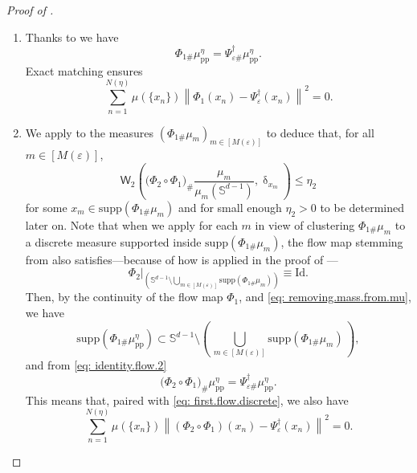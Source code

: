 \documentclass[a4paper,11pt]{article}
\theoremstyle{plain}
\newcommand{\supp}{\mathrm{supp}}
\renewcommand{\S}{\mathbb{S}^{d-1}}
\renewcommand{\leq}{\leqslant}
\numberwithin{equation}{section}
\begin{document}
\begin{proof}[Proof of ]
\begin{enumerate}
    \item Thanks to  we have
\begin{equation*}
\Phi_{1\#}\mu^\eta_{\text{pp}}=\Psi^\dagger_{\varepsilon\#} \mu^\eta_{\text{pp}}.
\end{equation*}
Exact matching ensures
\begin{equation}\label{eq: first.flow.discrete}
    \sum_{n=1}^{N(\eta)} \mu(\{x_n\})\left\|\Phi_1(x_n)-\Psi^\dagger_\varepsilon(x_n)\right\|^2=0.
\end{equation}
\item We apply  to the measures $(\Phi_{1\#}\mu_m)_{m\in[M(\varepsilon)]}$ to deduce that, for all $m\in[M(\varepsilon)]$,
\begin{equation*}
\mathsf{W}_2\left(\Big(\Phi_2\circ\Phi_1\Big)_{\#}\frac{\mu_m}{ \mu_m(\S)}, \updelta_{x_{m}}\right)\leq \eta_2
\end{equation*}
for some $x_{m}\in \supp(\Phi_{1\#}\mu_m)$ and for small enough $\eta_2>0$ to be determined later on. Note that when we apply  for each $m$ in view of clustering $\Phi_{1\#}\mu_m$ to a discrete measure supported inside $\supp(\Phi_{1\#}\mu_m)$, the flow map stemming from  also satisfies---because of how  is applied in the proof of ---
\begin{equation}\label{eq: identity.flow.2}
\Phi_2\bigg|_{\left(\S\setminus\bigcup_{m\in[M(\varepsilon)]} \supp(\Phi_{1\#}\mu_m)\right)}\equiv\mathrm{Id}.
\end{equation}
Then, by the continuity of the flow map $\Phi_1$, and \eqref{eq: removing.mass.from.mu},
we have 
$$
\supp\left(\Phi_{1\#}\mu_{\text{pp}}^\eta\right)\subset \S\setminus\left(\,\bigcup_{m\in[M(\varepsilon)]}\supp(\Phi_{1\#}\mu_m)\,\right),
$$
and from \eqref{eq: identity.flow.2}
\begin{equation*}
    \Big(\Phi_2\circ\Phi_1\Big)_\#\mu^\eta_{\text{pp}} =\Psi^\dagger_{\varepsilon\#}\mu^\eta_{\text{pp}}.
\end{equation*}
This means that, paired with \eqref{eq: first.flow.discrete}, we also have
\begin{equation*} %
    \sum_{n=1}^{N(\eta)} \mu(\{x_n\})\left\|(\Phi_2\circ\Phi_1)(x_n)-\Psi^\dagger_\varepsilon(x_n)\right\|^2=0.
\end{equation*}


\end{enumerate}
\end{proof}
\end{document}
